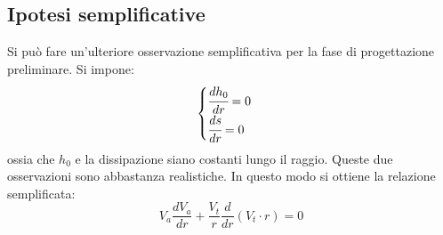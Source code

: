 \subsection{Ipotesi semplificative}
Si può fare un'ulteriore osservazione semplificativa per la fase di progettazione preliminare. Si impone:
\begin{align*}
\begin{cases}
\cfrac{dh_0}{dr} = 0\\
\cfrac{ds}{dr} = 0 
\end{cases}
\end{align*}
ossia che $h_0$ e la dissipazione siano costanti lungo il raggio. Queste due osservazioni sono abbastanza realistiche. In questo modo si ottiene la relazione semplificata:
\begin{equation}
\boxed{ V_a \frac{d V_a}{dr} + \frac{V_t}{r} \frac{d}{dr}(V_t \cdot r) = 0}
\label{eq:EquilibrioRadSemp}
\end{equation}
